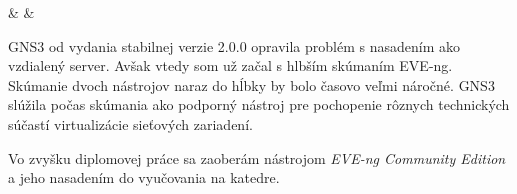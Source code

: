 \begin{longtabu}
                                   &                                                                                                                                                                                                                                                &                                                                                                            \\ \hline
\end{longtabu}

GNS3 od vydania stabilnej verzie 2.0.0 opravila problém s nasadením ako vzdialený server. Avšak vtedy som už začal s hlbším skúmaním EVE-ng. Skúmanie dvoch nástrojov naraz do hĺbky by bolo časovo veľmi náročné. GNS3 slúžila počas skúmania ako podporný nástroj pre pochopenie rôznych technických súčastí virtualizácie sieťových zariadení.

Vo zvyšku diplomovej práce sa zaoberám nástrojom \emph{EVE-ng Community Edition} a jeho nasadením do vyučovania na katedre.
